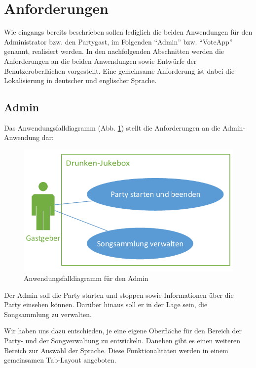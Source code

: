 \newpage
\section{Anforderungen}
\label{sec:Anforderungen}
Wie eingangs bereits beschrieben sollen lediglich die beiden Anwendungen für den Administrator bzw. den Partygast, im Folgenden "`Admin"' bzw. "`VoteApp"' genannt, realisiert werden. In den nachfolgenden Abschnitten werden die Anforderungen an die beiden Anwendungen sowie Entwürfe der Benutzeroberflächen vorgestellt. Eine gemeinsame Anforderung ist dabei die Lokalisierung in deutscher und englischer Sprache.

\subsection{Admin}
Das Anwendungsfalldiagramm (Abb. \ref{fig:AdminUseCase}) stellt die Anforderungen an die Admin-Anwendung dar:

\begin{figure}[H]
\centering
\includegraphics[width=0.7\linewidth]{Bilder/AdminUseCase}
\caption{Anwendungsfalldiagramm für den Admin\protect\footnotemark}
\label{fig:AdminUseCase}
\end{figure}

Der Admin soll die Party starten und stoppen sowie Informationen über die Party einsehen können. Darüber hinaus soll er in der Lage sein, die Songsammlung zu verwalten.

Wir haben uns dazu entschieden, je eine eigene Oberfläche für den Bereich der Party- und der Songverwaltung zu entwickeln. Daneben gibt es einen weiteren Bereich zur Auswahl der Sprache. Diese Funktionalitäten werden in einem gemeinsamen Tab-Layout angeboten.
  
